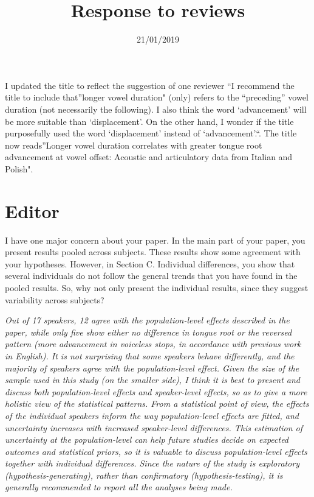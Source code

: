 \documentclass[]{article}
\title{Response to reviews}
\author{}
\date{21/01/2019}
\begin{document}
\maketitle

I updated the title to reflect the suggestion of one reviewer ``I
recommend the title to include that''longer vowel duration" (only)
refers to the ``preceding'' vowel duration (not necessarily the
following). I also think the word `advancement' will be more suitable
than `displacement'. On the other hand, I wonder if the title
purposefully used the word `displacement' instead of `advancement'.``.
The title now reads''Longer vowel duration correlates with greater
tongue root advancement at vowel offset: Acoustic and articulatory data
from Italian and Polish".

\hypertarget{editor}{%
\section{Editor}\label{editor}}

I have one major concern about your paper. In the main part of your
paper, you present results pooled across subjects. These results show
some agreement with your hypotheses. However, in Section C. Individual
differences, you show that several individuals do not follow the general
trends that you have found in the pooled results. So, why not only
present the individual results, since they suggest variability across
subjects?

\begin{adjustwidth}{1cm}{} \textit{
Out of 17 speakers, 12 agree with the population-level effects described in the paper, while only five show either no difference in tongue root or the reversed pattern (more advancement in voiceless stops, in accordance with previous work in English). It is not surprising that some speakers behave differently, and the majority of speakers agree with the population-level effect.
Given the size of the sample used in this study (on the smaller side), I think it is best to present and discuss both population-level effects and speaker-level effects, so as to give a more holistic view of the statistical patterns. From a statistical point of view, the effects of the individual speakers inform the way population-level effects are fitted, and uncertainty increases with increased speaker-level differences. This estimation of uncertainty at the population-level can help future studies decide on expected outcomes and statistical priors, so it is valuable to discuss population-level effects together with individual differences. Since the nature of the study is exploratory (hypothesis-generating), rather than confirmatory (hypothesis-testing), it is generally recommended to report all the analyses being made.
} \end{adjustwidth}
\end{document}
